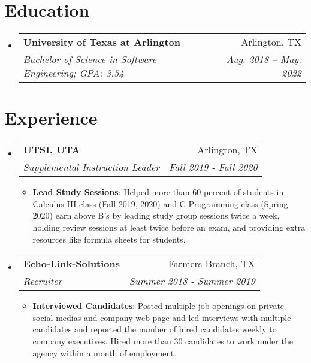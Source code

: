 \documentclass[letterpaper,11pt]{article}
\makeatletter
\newcommand{\resumeItem}[2]{
  \item\small{
    \textbf{#1}{: #2 \vspace{-2pt}}
  }
}
\newcommand{\resumeSubheading}[4]{
  \vspace{-1pt}\item
    \begin{tabular*}{0.97\textwidth}{l@{\extracolsep{\fill}}r}
      \textbf{#1} & #2 \\
      \textit{\small#3} & \textit{\small #4} \\
    \end{tabular*}\vspace{-5pt}
}
\newcommand{\resumeSubHeadingListStart}{\begin{itemize}[leftmargin=*]}
\newcommand{\resumeSubHeadingListEnd}{\end{itemize}}
\newcommand{\resumeItemListStart}{\begin{itemize}}
\newcommand{\resumeItemListEnd}{\end{itemize}\vspace{-5pt}}
\makeatother
\begin{document}
%

\section{Education}
  \resumeSubHeadingListStart
    \resumeSubheading
      {University of Texas at Arlington}{Arlington, TX}
      {Bachelor of Science in Software Engineering;  GPA: 3.54}{Aug. 2018 -- May. 2022}
  \resumeSubHeadingListEnd

\section{Experience}
  \resumeSubHeadingListStart

    \resumeSubheading
      {UTSI, UTA}{Arlington, TX}
      {Supplemental Instruction Leader}{Fall 2019 - Fall 2020}
      \resumeItemListStart
        \resumeItem{Lead Study Sessions}
          {Helped more than 60 percent of students in Calculus III class (Fall 2019, 2020) and C Programming class (Spring 2020) earn above B’s by leading study group sessions twice a week, holding review sessions at least twice before an exam, and providing extra resources like formula sheets for students.}
      \resumeItemListEnd

    \resumeSubheading
      {Echo-Link-Solutions}{Farmers Branch, TX}
      {Recruiter}{Summer 2018 - Summer 2019}
      \resumeItemListStart
        \resumeItem{Interviewed Candidates}
          {Posted multiple job openings on private social medias and company web page and led interviews with multiple candidates and reported the number of hired candidates weekly to company executives. Hired more than 30 candidates to work under the agency within a month of employment.}
        
      \resumeItemListEnd

   
  \resumeSubHeadingListEnd





\end{document}
